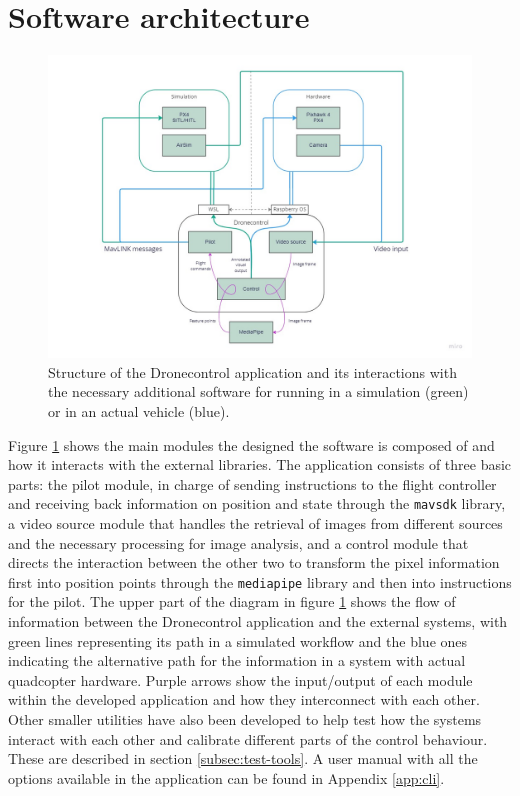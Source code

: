 \section{Software architecture}

\begin{figure}
  \centering
  \includegraphics[width=\textwidth, keepaspectratio]{img/software-arch.jpg}
  \caption{Structure of the Dronecontrol application and its interactions with the necessary additional software for running in a simulation (green) or in an actual vehicle (blue).}\label{fig:architecture}
\end{figure}


Figure \ref{fig:architecture} shows the main modules the designed the software is composed of and how it interacts with the external libraries.
The application consists of three basic parts: 
the pilot module, in charge of sending instructions to the flight controller and receiving back information on position and state through the \texttt{mavsdk} library, 
a video source module that handles the retrieval of images from different sources and the necessary processing for image analysis,
and a control module that directs the interaction between the other two to transform the pixel information first into position points through the \texttt{mediapipe} library and then into instructions for the pilot.
The upper part of the diagram in figure \ref{fig:architecture} shows the flow of information between the Dronecontrol application and the external systems, with green lines representing its path in a simulated workflow and the blue ones indicating the alternative path for the information in a system with actual quadcopter hardware.
Purple arrows show the input/output of each module within the developed application and how they interconnect with each other.
Other smaller utilities have also been developed to help test how the systems interact with each other and calibrate different parts of the control behaviour.
These are described in section \ref{subsec:test-tools}.
A user manual with all the options available in the application can be found in Appendix \ref{app:cli}.

